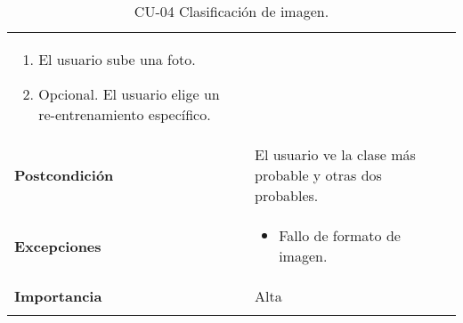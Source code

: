 \begin{longtable}[H]{@{}ll@{}}
\begin{minipage}[t]{0.68\columnwidth}
\begin{enumerate}
\def\labelenumi{\arabic{enumi}.}
\tightlist
\item
  El usuario sube una foto.
\item 
  Opcional. El usuario elige un re-entrenamiento específico.
\end{enumerate}\strut
\end{minipage}\tabularnewline
\begin{minipage}[t]{0.26\columnwidth}\raggedright\strut
\textbf{Postcondición}\strut
\end{minipage} & \begin{minipage}[t]{0.68\columnwidth}\raggedright\strut%
El usuario ve la clase más probable y otras dos probables.\strut
\end{minipage}\tabularnewline
\begin{minipage}[t]{0.26\columnwidth}\raggedright\strut
\textbf{Excepciones}\strut
\end{minipage} & \begin{minipage}[t]{0.68\columnwidth}\raggedright\strut%
\begin{itemize}
\tightlist
\item
  Fallo de formato de imagen.
\end{itemize}\strut
\end{minipage}\tabularnewline
\begin{minipage}[t]{0.26\columnwidth}\raggedright\strut
\textbf{Importancia}\strut
\end{minipage} & \begin{minipage}[t]{0.68\columnwidth}\raggedright\strut%
Alta\strut
\end{minipage}\tabularnewline
\bottomrule%
\caption{CU-04 Clasificación de imagen.}
\end{longtable}


